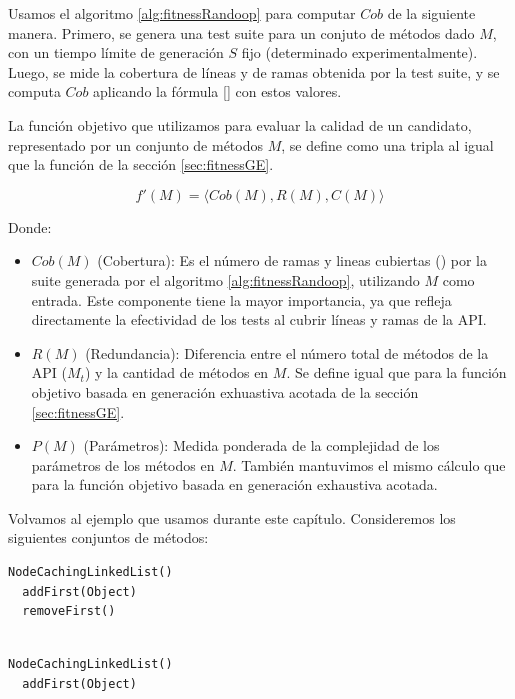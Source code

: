 Usamos el algoritmo \ref{alg:fitnessRandoop} para computar $Cob$ de la siguiente manera.
Primero, se genera una test suite para un conjuto de métodos dado $M$, con un tiempo límite
de generación $S$ fijo (determinado experimentalmente). Luego, se mide  
 la cobertura de líneas y de ramas obtenida por la test suite, y se computa
 $Cob$ aplicando la fórmula \ref{}  con estos valores.

La función objetivo que utilizamos para evaluar la calidad de un candidato, 
representado por un conjunto de métodos $M$, se define como una tripla al igual 
que la función de la sección \ref{sec:fitnessGE}.

\[
f'(M) = \langle Cob(M), R(M), C(M) \rangle
\]

Donde:

\begin{itemize}
    \item $Cob(M)$ (Cobertura): Es el número de ramas y lineas cubiertas
        () por la
        suite generada por el algoritmo \ref{alg:fitnessRandoop}, utilizando $M$ como
        entrada. 
    Este componente tiene la mayor importancia, ya que refleja directamente la
    efectividad de los tests al cubrir líneas y ramas de la API.
\item $R(M)$ (Redundancia): Diferencia entre el número total de métodos de la
    API ($M_t$) y la cantidad de métodos en $M$. Se define igual que para la
    función objetivo basada en generación exhuastiva acotada de la sección \ref{sec:fitnessGE}.
    \item $P(M)$ (Parámetros): Medida ponderada de la complejidad de los
        parámetros de los métodos en $M$. También mantuvimos el mismo cálculo
        que para la función objetivo basada en generación exhaustiva acotada.
\end{itemize}

Volvamos al ejemplo que usamos durante este capítulo. Consideremos los siguientes conjuntos de métodos:

\begin{lstlisting}[numbers=none, caption=Conjunto de métodos \( M_1 \)]
  NodeCachingLinkedList()
  addFirst(Object)
  removeFirst()
  
\end{lstlisting} 


\begin{lstlisting}[numbers=none, caption=Conjunto de métodos \( M_2 \)]
  NodeCachingLinkedList()
  addFirst(Object)

   
\end{lstlisting}


